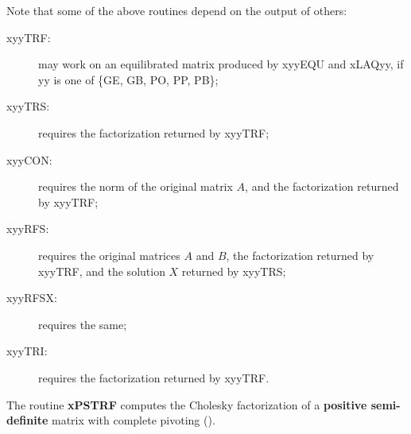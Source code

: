 Note that some of the above routines depend on the output of others:

\begin{description}

\item[xyyTRF:] may work on an equilibrated matrix produced by
xyyEQU and xLAQyy, if yy is one of \{GE, GB, PO, PP, PB\};

\item[xyyTRS:] requires the factorization returned by xyyTRF;

\item[xyyCON:] requires the norm of the original matrix $A$, and the
factorization returned by xyyTRF;

\item[xyyRFS:] requires the original matrices $A$ and $B$, the factorization
returned by xyyTRF, and the solution $X$ returned by xyyTRS;

\item[xyyRFSX:] requires the same;

\item[xyyTRI:] requires the factorization returned by xyyTRF.

\end{description}

The routine {\bf xPSTRF} computes the Cholesky factorization
of a {\bf positive semi-definite} matrix with complete pivoting (\cite{lucas04}).

